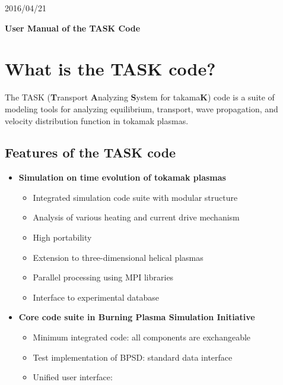 \documentclass[11pt]{article}
\begin{document}
\begin{flushright}
2016/04/21
\end{flushright}

\begin{center}
\textbf{\Large User Manual of the TASK Code}
\end{center}

\tableofcontents

\section{What is the TASK code?}

The TASK (\textbf{T}ransport \textbf{A}nalyzing \textbf{S}ystem for
takama\textbf{K}) code is a suite of modeling tools for analyzing equilibrium,
transport, wave propagation, and velocity distribution function in
tokamak plasmas.

\subsection{Features of the TASK code}
\begin{itemize}
\item
\textbf{Simulation on time evolution of tokamak plasmas}
\begin{itemize}
\item
Integrated simulation code suite with modular structure
\item
Analysis of various heating and current drive mechanism
\item
High portability
\item
Extension to three-dimensional helical plasmas
\item
Parallel processing using MPI libraries
\item
Interface to experimental database
\end{itemize}
\item
\textbf{Core code suite in Burning Plasma Simulation Initiative}
\begin{itemize}
\item
Minimum integrated code: all components are exchangeable
\item
Test implementation of BPSD: standard data interface
\item
Unified user interface: 
\end{itemize}
\end{itemize}
\end{document}

